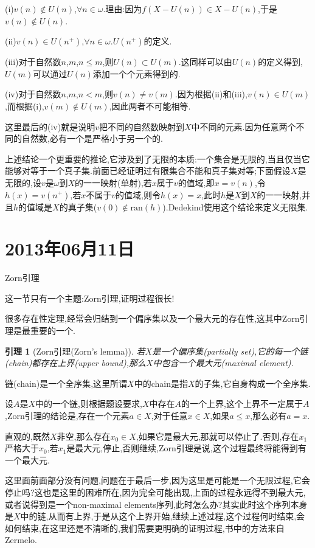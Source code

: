 \documentclass[12pt,a4paper,openany]{book}
\newtheorem{lemma}{引理}[section]
\begin{document}
(i)$v(n) \notin U(n)$,$\forall n \in \omega$.理由:因为$f(X-U(n)) \in X-U(n)$,于是$v(n) \notin U(n)$.

(ii)$v(n) \in U(n^+)$,$\forall n \in \omega$.$U(n^+)$的定义.

(iii)对于自然数$n$,$m$,$n \le m$,则$U(n) \subset U(m)$.这同样可以由$U(n)$的定义得到,$U(m)$可以通过$U(n)$添加一个个元素得到的.

(iv)对于自然数$n$,$m$,$n<m$,则$v(n) \neq v(m)$.因为根据(ii)和(iii),$v(n) \in U(m)$,而根据(i),$v(m) \notin U(m)$,因此两者不可能相等.

这里最后的(iv)就是说明$v$把不同的自然数映射到$X$中不同的元素.因为任意两个不同的自然数,必有一个是严格小于另一个的.

上述结论一个更重要的推论,它涉及到了无限的本质:一个集合是无限的,当且仅当它能够对等于一个真子集.前面已经证明过有限集合不能和真子集对等;下面假设$X$是无限的,设$v$是$\omega$到$X$的一一映射(单射),若$x$属于$v$的值域,即$x=v(n)$,令$h(x)=v(n^+)$,若$x$不属于$v$的值域,则令$h(x)=x$,此时$h$是$X$到$X$的一一映射,并且$h$的值域是$X$的真子集($v(0) \notin \text{ran}{(h)}$).Dedekind使用这个结论来定义无限集.

\section{2013年06月11日}
Zorn引理

这一节只有一个主题:Zorn引理,证明过程很长!

很多存在性定理,经常会归结到一个偏序集以及一个最大元的存在性,这其中Zorn引理是最重要的一个.

\begin{lemma}[Zorn引理(Zorn's lemma)]
若$X$是一个偏序集(partially set),它的每一个链(chain)都存在上界(upper bound),那么$X$中包含一个最大元(maximal element).
\end{lemma}

链(chain)是一个全序集,这里所谓$X$中的chain是指$X$的子集,它自身构成一个全序集.

设$A$是$X$中的一个链,则根据题设要求,$X$中存在$A$的一个上界,这个上界不一定属于$A$,Zorn引理的结论是,存在一个元素$a \in X$,对于任意$x \in X$,如果$a \le x$,那么必有$a=x$.

直观的,既然$X$非空,那么存在$x_0 \in X$,如果它是最大元,那就可以停止了.否则,存在$x_1$严格大于$x_0$,若$x_1$是最大元,停止,否则继续,Zorn引理是说,这个过程最终将能得到有一个最大元.

这里面前面部分没有问题,问题在于最后一步,因为这里是可能是一个无限过程,它会停止吗?这也是这里的困难所在,因为完全可能出现,上面的过程永远得不到最大元,或者说得到是一个non-maximal elements序列,此时怎么办?其实此时这个序列本身是$X$中的链,从而有上界,于是从这个上界开始,继续上述过程,这个过程何时结束,会如何结束,在这里还是不清晰的,我们需要更明确的证明过程,书中的方法来自Zermelo.
\end{document}
